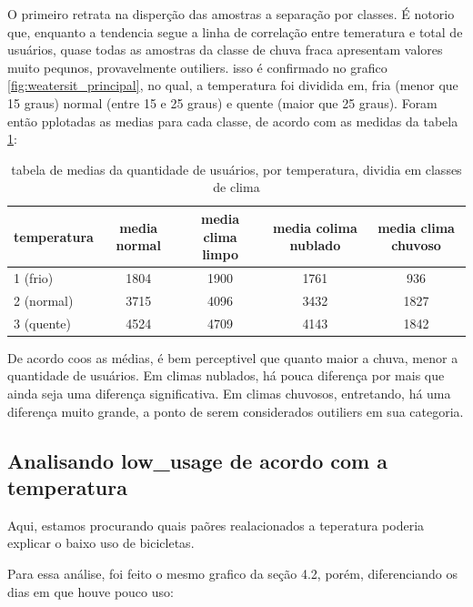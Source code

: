 \documentclass[12pt,a4paper]{article}
\begin{document}
O primeiro retrata na disperção das amostras a separação por classes. É notorio que, enquanto a tendencia segue a linha de correlação entre temeratura 
e total de usuários, quase todas as amostras da classe de chuva fraca apresentam valores muito pequnos, provavelmente outiliers. isso é confirmado no grafico \ref{fig:weatersit_principal},
no qual, a temperatura foi dividida em, fria (menor que 15 graus) normal (entre 15 e 25 graus) e quente (maior que 25 graus). Foram então pplotadas as medias para cada classe,
de acordo com as medidas da tabela \ref{tab:medias_clima}:

\begin{table}[H]
    \centering
    \caption{tabela de medias da quantidade de usuários, por temperatura, dividia em classes de clima}
    \label{tab:medias_clima}
    \begin{tabular}{lcccc}
        \toprule
        \textbf{temperatura} & {media normal} & {media clima limpo} & {media colima nublado} & {media clima chuvoso}\\
        \midrule
        1 (frio) & 1804 & 1900 & 1761 & 936 \\
        2 (normal) &  3715 & 4096 & 3432 & 1827 \\
        3 (quente) & 4524 & 4709  & 4143 & 1842 \\
        \bottomrule
    \end{tabular}
    \vspace{2mm}
\end{table}


De acordo coos as médias, é bem perceptivel que quanto maior a chuva, menor a quantidade de usuários. Em climas nublados, há pouca diferença
por mais que ainda seja uma diferença significativa. Em climas chuvosos, entretando, há uma diferença muito grande, a ponto de serem considerados outiliers em sua categoria.


\subsection{Analisando low\_usage de acordo com a temperatura}

Aqui, estamos procurando quais paõres realacionados a teperatura poderia explicar o baixo uso
de bicicletas. 

Para essa análise, foi feito o mesmo grafico da seção 4.2, porém, diferenciando os dias em que houve
pouco uso:
\end{document}
